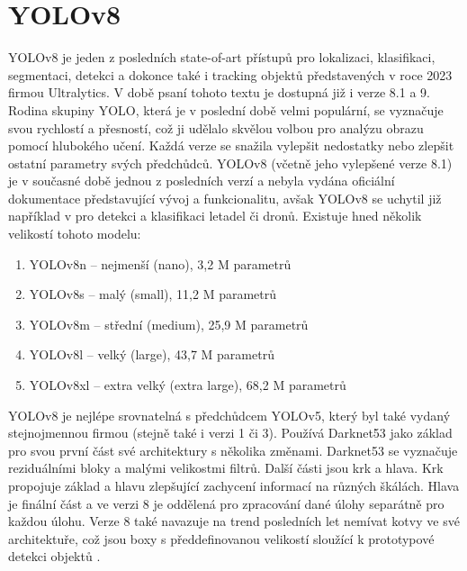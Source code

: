\section{YOLOv8}
\label{sec:Chapter26}
YOLOv8 je jeden z posledních state-of-art přístupů pro lokalizaci, klasifikaci, segmentaci, detekci a dokonce také i tracking objektů představených v roce 2023 firmou Ultralytics. V době psaní tohoto textu je dostupná již i verze 8.1 a 9. Rodina skupiny YOLO, která je v poslední době velmi populární, se vyznačuje svou rychlostí a přesností, což ji udělalo skvělou volbou pro analýzu obrazu pomocí hlubokého učení. Každá verze se snažila vylepšit nedostatky nebo zlepšit ostatní parametry svých předchůdců. YOLOv8 (včetně jeho vylepšené verze 8.1) je v současné době jednou z posledních verzí a nebyla vydána oficiální dokumentace představující vývoj a funkcionalitu, avšak YOLOv8 se uchytil již například v \cite{yoloplane} pro detekci a klasifikaci letadel či dronů. Existuje hned několik velikostí tohoto modelu:
\begin{enumerate}
  \item YOLOv8n -- nejmenší (nano), 3,2 M parametrů
  \item YOLOv8s -- malý (small), 11,2 M parametrů
  \item YOLOv8m -- střední (medium), 25,9 M parametrů
  \item YOLOv8l -- velký (large), 43,7 M parametrů
  \item YOLOv8xl -- extra velký (extra large), 68,2 M parametrů
\end{enumerate}

YOLOv8 je nejlépe srovnatelná s předchůdcem YOLOv5, který byl také vydaný stejnojmennou firmou (stejně také i verzi 1 či 3). Používá Darknet53 \cite{darknet} jako základ pro svou první část své architektury s několika změnami. Darknet53 se vyznačuje reziduálními bloky a malými velikostmi filtrů. Další části jsou krk a hlava. Krk propojuje základ a hlavu zlepšující zachycení informací na různých škálách. Hlava je finální část a ve verzi 8 je oddělená pro zpracování dané úlohy separátně pro každou úlohu. Verze 8 také navazuje na trend posledních let nemívat kotvy ve své architektuře, což jsou boxy s předdefinovanou velikostí sloužící k prototypové detekci objektů \cite{yolo_comparison}.


\endinput